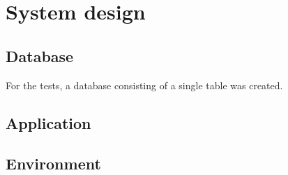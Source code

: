 \chapter{System design}

\section{Database}

For the tests, a database consisting of a single table was created. 

\section{Application}
\section{Environment}